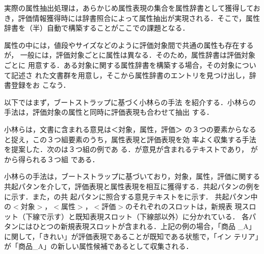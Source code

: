 実際の属性抽出処理は，あらかじめ属性表現の集合を属性辞書として獲得してお
き，評価情報獲得時には辞書照合によって属性抽出が実現される．そこで，属性
辞書を（半）自動で構築することがここでの課題となる．

属性の中には，値段やサイズなどのように評価対象間で共通の属性も存在するが，
一般には，評価対象ごとに属性は異なる．そのため，属性辞書は評価対象ごとに
用意する．ある対象に関する属性辞書を構築する場合，その対象について記述さ
れた文書群を用意し，そこから属性辞書のエントリを見つけ出し，辞書登録をお
こなう．

以下ではまず，ブートストラップに基づく小林ら\cite{kobayashi2005a}の手法
を紹介する．小林らの手法は，評価対象の属性と同時に評価表現も合わせて抽出
する．


\vspace{1em}
\underline{\textbf{\cite{kobayashi2005a}}}
\vspace{1em}

小林ら\cite{kobayashi2005a}は，文書に含まれる意見は＜対象，属性，評価＞
の３つの要素からなると捉え，この３つ組要素のうち，属性表現と評価表現を効
率よく収集する手法を提案した．次のは３つ組の例であ
る．が意見が含まれるテキストであり，
がから得られる３つ組
である．

小林らの手法は，ブートストラップに基づいており，対象，属性，評価に関する
共起パタンを介して，評価表現と属性表現を相互に獲得する．共起パタンの例を
に示す．また，の共
起パタンに照合する意見テキストをに示す．
共起パタン中の$<対象>$，$<属性>$，$<評価>$のそれぞれのスロットは，新規表
現スロット（下線で示す）と既知表現スロット（下線部以外）に分かれている．
各パタンにはひとつの新規表現スロットが含まれる．上記の例の場合，「商品
\_A」に関して，「きれい」が評価表現であることが既知である状態で，「イン
テリア」が「商品\_A」の新しい属性候補であるとして収集される．

